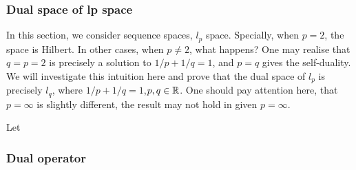 \subsubsection{Dual space of lp space}\label{lp dual}
In this section, we consider sequence spaces, $l_p$ space. Specially, when $p=2$, the space is Hilbert. In other cases,  when $p\not=2$, what happens? One may realise that $q=p=2$ is precisely a solution to $1/p+1/q=1$, and $p=q$ gives the self-duality. We will investigate this intuition here and prove that the dual space of $l_p$ is precisely $l_q$, where $1/p+1/q=1$,$p,q\in\mathbb{R}$. One should pay attention here, that $p=\infty$ is slightly different, the result may not hold in given $p=\infty$.

\begin{theorem}\rm\nextline
	Let 
\end{theorem}


\subsubsection{Dual operator}\label{dual operator}
